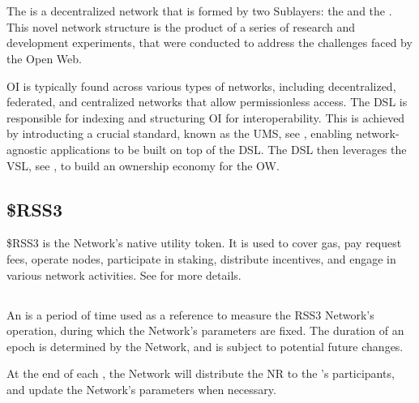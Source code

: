 \section{}

The  is a decentralized network that is formed by two Sublayers: the  and the .
This novel network structure is the product of a series of research and development experiments, that were conducted to address the challenges faced by the Open Web.

\gls{OI} is typically found across various types of networks, including decentralized, federated, and centralized networks that allow permissionless access.
The \gls{DSL} is responsible for indexing and structuring \gls{OI} for interoperability.
This is achieved by introducting a crucial standard, known as the \gls{UMS}, see , enabling network-agnostic applications to be built on top of the \gls{DSL}.
The \gls{DSL} then leverages the \gls{VSL}, see , to build an ownership economy for the \gls{OW}.

\subsection{\$RSS3}
\$RSS3 is the Network's native utility token. It is used to cover gas, pay request fees, operate nodes, participate in staking, distribute incentives, and engage in various network activities. See  for more details.

\subsection{}

An  is a period of time used as a reference to measure the RSS3 Network’s operation, during which the Network's parameters are fixed.
The duration of an epoch is determined by the Network, and is subject to potential future changes.

At the end of each \epoch, the Network will distribute the \gls{NR} to the 's participants, and update the Network's parameters when necessary.